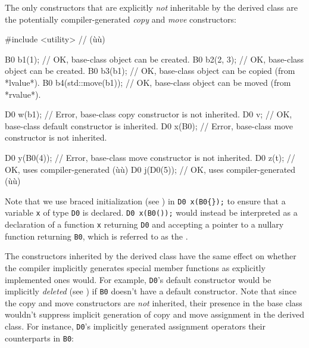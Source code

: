 \noindent The only constructors that are explicitly \emph{not} inheritable by the
derived class are the potentially compiler-generated \emph{copy} and
\emph{move} constructors:

\begin{emcppslisting}[emcppsbatch=e1]
#include <utility>  // (ù{}ù)

B0 b1(1);              // OK, base-class object can be created.
B0 b2(2, 3);           // OK, base-class object can be created.
B0 b3(b1);             // OK, base-class object can be copied (from *lvalue*).
B0 b4(std::move(b1));  // OK, base-class object can be moved (from *rvalue*).

D0 w(b1);    // Error, base-class copy constructor is not inherited.
D0 v;        // OK, base-class default constructor is inherited.
D0 x(B0{});  // Error, base-class move constructor is not inherited.

D0 y(B0(4));  // Error, base-class move constructor is not inherited.
D0 z(t);      // OK, uses compiler-generated (ù{}ù)
D0 j(D0(5));  // OK, uses compiler-generated (ù{}ù)
\end{emcppslisting}

\noindent Note that we use
 braced initialization (see ) 
  in \lstinline!D0!~\lstinline!x(B0{});!
  to ensure that a variable \lstinline!x! of type \lstinline!D0! is declared.
  \lstinline!D0!~\lstinline!x(B0());! would instead be interpreted as a
  declaration of a function \lstinline!x! returning \lstinline!D0! and
  accepting a pointer to a nullary function returning \lstinline!B0!, which
  is referred to as the .
    
The constructors inherited by the derived class have the same effect on
whether the compiler implicitly generates special member functions as
explicitly implemented ones would. For example, \lstinline!D0!'s default
constructor would be implicitly \emph{deleted} (see ) 
if
\lstinline!B0! doesn't have a default constructor. Note that since the copy
and move constructors are \emph{not} inherited, their presence in the
base class wouldn't suppress implicit generation of copy and move
assignment in the derived class. For instance, \lstinline!D0!'s implicitly
generated assignment operators  their
counterparts in \lstinline!B0!:

